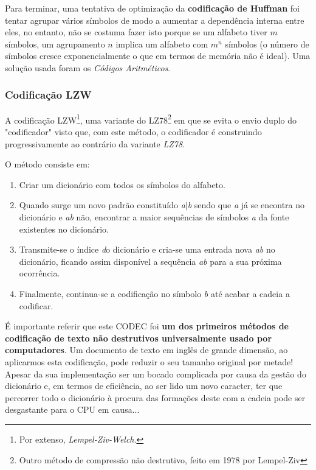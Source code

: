 \documentclass[11pt,journal,compsoc]{IEEEtran}
\begin{document}
    
    Para terminar, uma tentativa de optimização da \textbf{codificação de Huffman} foi tentar agrupar vários símbolos de modo a aumentar a dependência interna entre eles, no entanto, não se costuma fazer isto porque se um alfabeto tiver $m$ símbolos, um agrupamento $n$ implica um alfabeto com $m^n$ símbolos (o número de símbolos cresce exponencialmente o que em termos de memória não é ideal). Uma solução usada foram os \textit{Códigos Aritméticos}.
    
    
    \subsubsection{Codificação \textbf{LZW}}
    A codificação LZW\footnote{Por extenso, \textit{Lempel-Ziv-Welch}.}, uma variante do LZ78\footnote{Outro método de compressão não destrutivo, feito em 1978 por Lempel-Ziv} em que se evita o envio duplo do "codificador" visto que, com este método, o codificador é construindo progressivamente ao contrário da variante \textit{LZ78}.
    
    O método consiste em:
    \begin{enumerate}
        \item Criar um dicionário com todos os símbolos do alfabeto. 
        \item Quando surge um novo padrão constituído \textit{a$|$b} sendo que \textit{a} já se encontra no dicionário e \textit{ab} não, encontrar a maior sequências de símbolos \textit{a} da fonte existentes no dicionário.
        \item Transmite-se o índice \textit do dicionário e cria-se uma entrada nova \textit{ab} no dicionário, ficando assim disponível a sequência \textit{ab} para a sua próxima ocorrência.
        \item Finalmente, continua-se a codificação no símbolo \textit{b} até acabar a cadeia a codificar.
    \end{enumerate}
    É importante referir que este CODEC foi \textbf{um dos primeiros métodos de codificação de texto não destrutivos universalmente usado por computadores}. Um documento de texto em inglês de grande dimensão, ao aplicarmos esta codificação, pode reduzir o seu tamanho original por metade! Apesar da sua implementação ser um bocado complicada por causa da gestão do dicionário e, em termos de eficiência, ao ser lido um novo caracter, ter que percorrer todo o dicionário à procura das formações deste com a cadeia pode ser desgastante para o CPU em causa...
    
\end{document}
